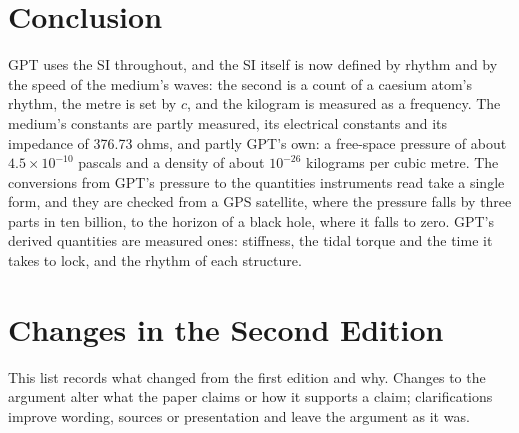 \documentclass[11pt,a4paper]{article}
\begin{document}
\section*{Conclusion}

GPT uses the SI throughout, and the SI itself is now defined by rhythm and by the speed of the medium's waves: the second is a count of a caesium atom's rhythm, the metre is set by $c$, and the kilogram is measured as a frequency. The medium's constants are partly measured, its electrical constants and its impedance of 376.73 ohms, and partly GPT's own: a free-space pressure of about $4.5\times10^{-10}$ pascals and a density of about $10^{-26}$ kilograms per cubic metre. The conversions from GPT's pressure to the quantities instruments read take a single form, and they are checked from a GPS satellite, where the pressure falls by three parts in ten billion, to the horizon of a black hole, where it falls to zero. GPT's derived quantities are measured ones: stiffness, the tidal torque and the time it takes to lock, and the rhythm of each structure.

\clearpage
\section*{Changes in the Second Edition}

This list records what changed from the first edition and why. Changes to the argument alter what the paper claims or how it supports a claim; clarifications improve wording, sources or presentation and leave the argument as it was.
\end{document}
